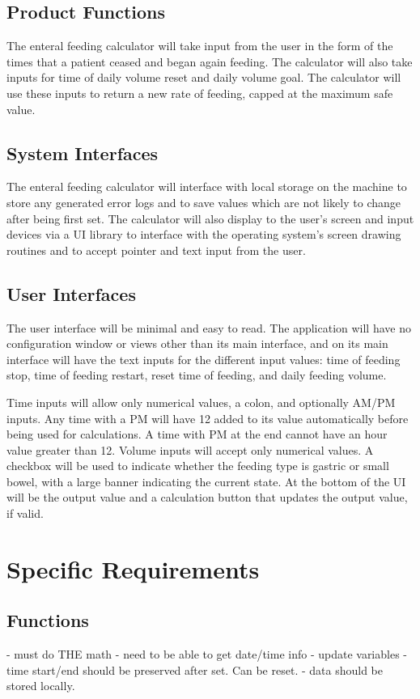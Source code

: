 \documentclass[10pt,draftclsnofoot,onecolumn]{IEEEtran}
\begin{document}
\subsection{Product Functions}
The enteral feeding calculator will take input from the user in the form of the times that a patient ceased and
began again feeding. The calculator will also take inputs for time of daily volume reset  and daily volume goal.
The calculator will use these inputs to return a new rate of feeding, capped at the maximum safe value.

\subsection{System Interfaces}
The enteral feeding calculator will interface with local storage on the machine to store any generated 
error logs and to save values which are not likely to change after being first set. The calculator will
also display to the user's screen and input devices via a UI library to interface with the operating system's screen drawing
routines and to accept pointer and text input from the user.

\subsection{User Interfaces}
The user interface will be minimal and easy to read. The application will have no configuration window
or views other than its main interface, and on its main interface will have the text inputs for the different
input values: time of feeding stop, time of feeding restart, reset time of feeding, and daily feeding volume.

Time inputs will allow only numerical values, a colon, and optionally AM/PM inputs. Any time with a PM will
have 12 added to its value automatically before being used for calculations. A time with PM at the end cannot have an hour value greater than 12.
Volume inputs will accept only numerical values. A checkbox will be used to indicate whether the feeding type is gastric or
small bowel, with a large banner indicating the current state. At the bottom of the UI will be the output value and a calculation
button that updates the output value, if valid.

\section{Specific Requirements}

\subsection{Functions}
- must do THE math
- need to be able to get date/time info
- update variables
- time start/end should be preserved after set. Can be reset.
- data should be stored locally.
\end{document}
